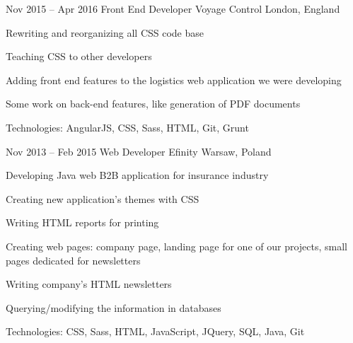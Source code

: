 \begin{sectionlist}
    \sectionlistitemjob
        {Nov 2015 -- Apr 2016}
        {Front End Developer}
        {Voyage Control}
        {London, England}
        {
            \begin{joblisting}
                \item Rewriting and reorganizing all CSS code base
                \item Teaching CSS to other developers
                \item Adding front end features to the logistics web
                    application we were developing
                \item Some work on back-end features, like generation of PDF
                    documents
                \item Technologies: AngularJS, CSS, Sass, HTML, Git, Grunt
            \end{joblisting}
        }

    \sectionlistitemjob
        {Nov 2013 -- Feb 2015}
        {Web Developer}
        {Efinity}
        {Warsaw, Poland}
        {
            \begin{joblisting}
                \item Developing Java web B2B application for insurance
                    industry
                \item Creating new application's themes with CSS
                \item Writing HTML reports for printing
                \item Creating web pages: company page, landing page for one
                    of our projects, small pages dedicated for newsletters
                \item Writing company's HTML newsletters
                \item Querying/modifying the information in databases
                \item Technologies: CSS, Sass, HTML, JavaScript, JQuery,
                    SQL, Java, Git
            \end{joblisting}
        }

\end{sectionlist}
